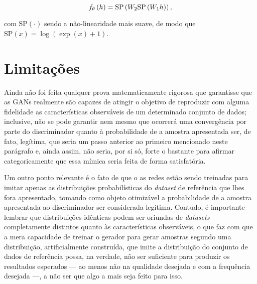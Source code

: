\begin{equation}
    f_{\theta}\left(h\right) = \text{SP}\left(W_{2}\text{SP}\left(W_{1}h\right)\right),
    \label{eq:08461671_gan_arch}
    \vspace{0.2cm}
\end{equation}

\noindent com $\text{SP}\left(\cdot\right)$ sendo a não-linearidade mais suave, de modo que $\text{SP}\left(x\right) = \log\left(\exp\left(x\right) +1 \right)$.













\section{Limitações}
\label{sec:gan_for_bss_limitacoes}

Ainda não foi feita qualquer prova matematicamente rigorosa que garantisse que as GANs realmente são capazes de atingir o objetivo de reproduzir com alguma fidelidade as características observáveis de um determinado conjunto de dados; inclusive, não se pode garantir nem mesmo que ocorrerá uma convergência por parte do discriminador quanto à probabilidade de a amostra apresentada ser, de fato, legítima, que seria um passo anterior ao primeiro mencionado neste parágrafo e, ainda assim, não seria, por si só, forte o bastante para afirmar categoricamente que essa mímica seria feita de forma satisfatória.

Um outro ponto relevante é o fato de que o as redes estão sendo treinadas para imitar apenas as distribuições probabilísticas do \textit{dataset} de referência que lhes fora apresentado, tomando como objeto otimizável a probabilidade de a amostra apresentada ao discriminador ser considerada legítima. Contudo, é importante lembrar que distribuições idênticas podem ser oriundas de \textit{datasets} completamente distintos quanto às características observáveis, o que faz com que a mera capacidade de treinar o gerador para gerar amostras segundo uma distribuição, artificialmente construída, que imite a distribuição do conjunto de dados de referência possa, na verdade, não ser suficiente para produzir os resultados esperados --- ao menos não na qualidade desejada e com a frequência desejada ---, a não ser que algo a mais seja feito para isso.



